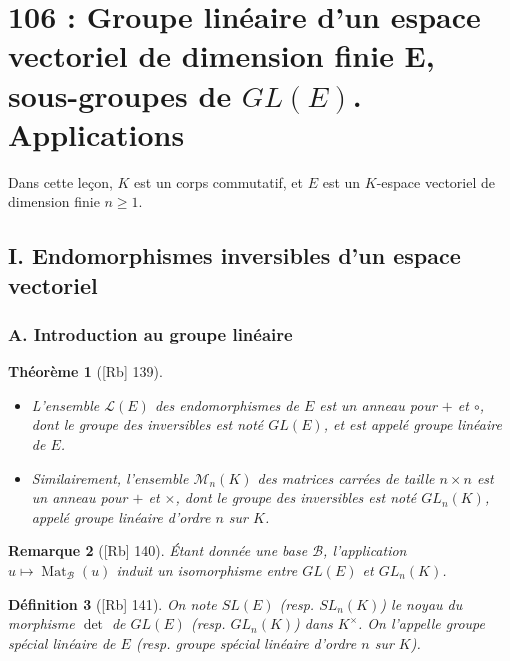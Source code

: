 \documentclass[10pt, a4paper, parskip=full, twoside, twocolumn]{report}
\newtheorem{definition}{Définition}
\newtheorem{theorem}[definition]{Théorème}
\newtheorem{remark}[definition]{Remarque}
\newcommand{\M}{\mathcal{M}}
\DeclareMathOperator{\Mat}{Mat}
\begin{document}
\chapter*{106 : Groupe linéaire d'un espace vectoriel de dimension finie E, sous-groupes de $GL(E)$. Applications}
\setcounter{definition}{0}

Dans cette leçon, $K$ est un corps commutatif, et $E$ est un $K$-espace vectoriel de dimension finie $n\geq 1$.
\section*{I. Endomorphismes inversibles d'un espace vectoriel}
\subsection*{A. Introduction au groupe linéaire}
\begin{theorem}[\textnormal{[Rb] 139}]
	\begin{itemize}
		\item L'ensemble $\mathcal{L}(E)$ des endomorphismes de $E$ est un anneau pour $+$ et $\circ$, dont le groupe des inversibles est noté $GL(E)$, et est appelé \emph{groupe linéaire} de $E$.
		\item Similairement, l'ensemble $\M_n(K)$ des matrices carrées de taille $n\times n$ est un anneau pour $+$ et $\times$, dont le groupe des inversibles est noté $GL_n(K)$, appelé \emph{groupe linéaire d'ordre $n$ sur $K$}.
	\end{itemize}
\end{theorem}

\begin{remark}[\textnormal{[Rb] 140}]
	Étant donnée une base $\mathcal{B}$, l'application $u\mapsto \Mat_{\mathcal{B}}(u)$ induit un isomorphisme entre $GL(E)$ et $GL_n(K)$.
\end{remark}

\begin{definition}[\textnormal{[Rb] 141}]
	On note $SL(E)$ (resp. $SL_n(K)$) le noyau du morphisme $\det$ de $GL(E)$ (resp. $GL_n(K)$) dans $K^{\times}$.
	On l'appelle \emph{groupe spécial linéaire de $E$} (resp. \emph{groupe spécial linéaire d'ordre $n$ sur $K$}).
\end{definition}
\end{document}
